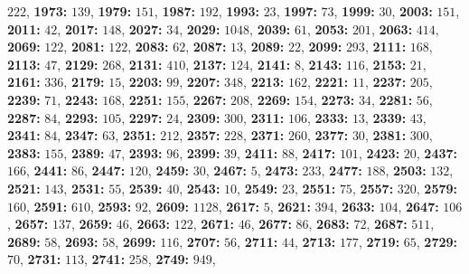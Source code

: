 $222$, \textsf{\bfseries 1973:} $139$, \textsf{\bfseries 1979:} $151$, \textsf{\bfseries 1987:} $192$, \textsf{\bfseries 1993:} $23$, 
\textsf{\bfseries 1997:} $73$, \textsf{\bfseries 1999:} $30$, \textsf{\bfseries 2003:} $151$, \textsf{\bfseries 2011:} $42$, \textsf{\bfseries 2017:} $148$, \textsf{\bfseries 2027:} $34$, \textsf{\bfseries 2029:} $1048$, \textsf{\bfseries 2039:} $61$, \textsf{\bfseries 2053:} $201$, \textsf{\bfseries 2063:} $414$, \textsf{\bfseries 2069:} $122$, \textsf{\bfseries 2081:} $122$, \textsf{\bfseries 2083:} $62$, \textsf{\bfseries 2087:} $13$, \textsf{\bfseries 2089:} $22$, \textsf{\bfseries 2099:} $293$, \textsf{\bfseries 2111:} $168$, \textsf{\bfseries 2113:} $47$, \textsf{\bfseries 2129:} $268$, \textsf{\bfseries 2131:} $410$, \textsf{\bfseries 2137:} $124$, \textsf{\bfseries 2141:} $8$, \textsf{\bfseries 2143:} $116$, \textsf{\bfseries 2153:} $21$, \textsf{\bfseries 2161:} $336$, \textsf{\bfseries 2179:} $15$, \textsf{\bfseries 2203:} $99$, \textsf{\bfseries 2207:} $348$, \textsf{\bfseries 2213:} $162$, \textsf{\bfseries 2221:} $11$, \textsf{\bfseries 2237:} $205$, \textsf{\bfseries 2239:} $71$, \textsf{\bfseries 2243:} $168$, \textsf{\bfseries 2251:} $155$, \textsf{\bfseries 2267:} $208$, \textsf{\bfseries 2269:} $154$, \textsf{\bfseries 2273:} $34$, \textsf{\bfseries 2281:} $56$, \textsf{\bfseries 2287:} $84$, \textsf{\bfseries 2293:} $105$, \textsf{\bfseries 2297:} $24$, \textsf{\bfseries 2309:} $300$, \textsf{\bfseries 2311:} $106$, \textsf{\bfseries 2333:} $13$, \textsf{\bfseries 2339:} $43$, \textsf{\bfseries 2341:} $84$, \textsf{\bfseries 2347:} $63$, \textsf{\bfseries 2351:} $212$, \textsf{\bfseries 2357:} $228$, \textsf{\bfseries 2371:} $260$, \textsf{\bfseries 2377:} $30$, \textsf{\bfseries 2381:} $300$, \textsf{\bfseries 2383:} $155$, \textsf{\bfseries 2389:} $47$, \textsf{\bfseries 2393:} $96$, \textsf{\bfseries 2399:} $39$, \textsf{\bfseries 2411:} $88$, \textsf{\bfseries 2417:} $101$, \textsf{\bfseries 2423:} $20$, \textsf{\bfseries 2437:} $166$, \textsf{\bfseries 2441:} $86$, \textsf{\bfseries 2447:} $120$, \textsf{\bfseries 2459:} $30$, \textsf{\bfseries 2467:} $5$, \textsf{\bfseries 2473:} $233$, \textsf{\bfseries 2477:} $188$, \textsf{\bfseries 2503:} $132$, \textsf{\bfseries 2521:} $143$, \textsf{\bfseries 2531:} $55$, \textsf{\bfseries 2539:} $40$, \textsf{\bfseries 2543:} $10$, \textsf{\bfseries 2549:} $23$, \textsf{\bfseries 2551:} $75$, \textsf{\bfseries 2557:} $320$, \textsf{\bfseries 2579:} $160$, \textsf{\bfseries 2591:} $610$, \textsf{\bfseries 2593:} $92$, \textsf{\bfseries 2609:} $1128$, \textsf{\bfseries 2617:} $5$, \textsf{\bfseries 2621:} $394$, \textsf{\bfseries 2633:} $104$, \textsf{\bfseries 2647:} $106$, \textsf{\bfseries 2657:} $137$, \textsf{\bfseries 2659:} $46$, \textsf{\bfseries 2663:} $122$, \textsf{\bfseries 2671:} $46$, \textsf{\bfseries 2677:} $86$, \textsf{\bfseries 2683:} $72$, \textsf{\bfseries 2687:} $511$, \textsf{\bfseries 2689:} $58$, \textsf{\bfseries 2693:} $58$, \textsf{\bfseries 2699:} $116$, \textsf{\bfseries 2707:} $56$, \textsf{\bfseries 2711:} $44$, \textsf{\bfseries 2713:} $177$, \textsf{\bfseries 2719:} $65$, \textsf{\bfseries 2729:} $70$, \textsf{\bfseries 2731:} $113$, \textsf{\bfseries 2741:} $258$, \textsf{\bfseries 2749:} $949$, 
